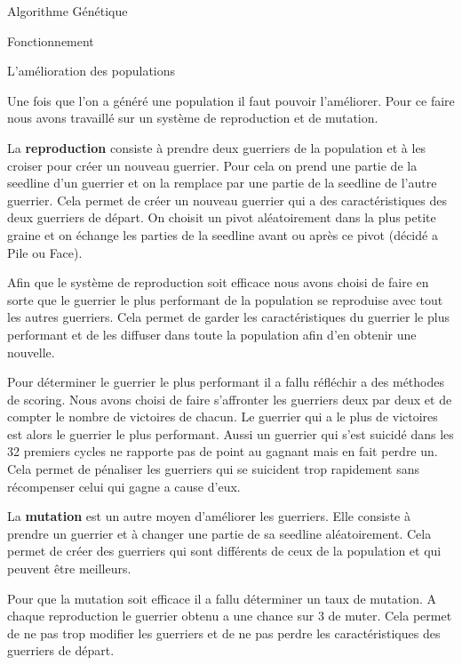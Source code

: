 \documentclass[a4paper, 10pt]{article}
\begin{document}
\begin{section}{Algorithme Génétique}
\begin{subsection}{Fonctionnement}
            \begin{subsubsection}{L'amélioration des populations}\label{sec:amelioration}
                \par
                    Une fois que l'on a généré une population il faut pouvoir l'améliorer. Pour ce faire nous avons travaillé sur un système de reproduction et de mutation.
                    \medskip
                \par
                    La \textbf{reproduction} consiste à prendre deux guerriers de la population et à les croiser pour créer un nouveau guerrier. Pour cela on prend une partie de la seedline d'un guerrier et on la remplace par une partie de la seedline de l'autre guerrier. Cela permet de créer un nouveau guerrier qui a des caractéristiques des deux guerriers de départ. On choisit un pivot aléatoirement dans la plus petite graine et on échange les parties de la seedline avant ou après ce pivot (décidé a Pile ou Face).
                    \medskip
                \par
                    Afin que le système de reproduction soit efficace nous avons choisi de faire en sorte que le guerrier le plus performant de la population se reproduise avec tout les autres guerriers. Cela permet de garder les caractéristiques du guerrier le plus performant et de les diffuser dans toute la population afin d'en obtenir une nouvelle.
                    \medskip
                \par
                    Pour déterminer le guerrier le plus performant il a fallu réfléchir a des méthodes de scoring. Nous avons choisi de faire s'affronter les guerriers deux par deux et de compter le nombre de victoires de chacun. Le guerrier qui a le plus de victoires est alors le guerrier le plus performant. Aussi un guerrier qui s'est suicidé dans les 32 premiers cycles ne rapporte pas de point au gagnant mais en fait perdre un. Cela permet de pénaliser les guerriers qui se suicident trop rapidement sans récompenser celui qui gagne a cause d'eux. 
                    \medskip
                \par
                    La \textbf{mutation} est un autre moyen d'améliorer les guerriers. Elle consiste à prendre un guerrier et à changer une partie de sa seedline aléatoirement. Cela permet de créer des guerriers qui sont différents de ceux de la population et qui peuvent être meilleurs.
                    \medskip
                \par
                    Pour que la mutation soit efficace il a fallu déterminer un taux de mutation. A chaque reproduction le guerrier obtenu a une chance sur 3 de muter. Cela permet de ne pas trop modifier les guerriers et de ne pas perdre les caractéristiques des guerriers de départ.

\end{subsubsection}
\end{subsection}
\end{section}
\end{document}
